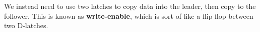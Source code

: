 
We instead need to use two latches to copy data into the leader, then copy to the follower. This is known as \textbf{write-enable}, which is sort of like a flip flop between two D-latches.
